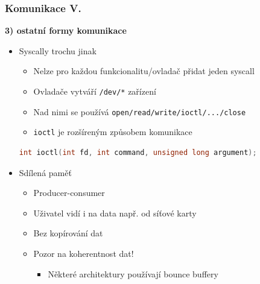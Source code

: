 \documentclass[xcolor=dvipsnames]{beamer}
\newcommand{\heading}[1]{\textbf{\textcolor{BurntOrange}{#1}}}
\begin{document}
\begin{frame}[fragile]
  \frametitle{Komunikace V.}
  \heading{3) ostatní formy komunikace}
  \begin{itemize}
  \item Syscally trochu jinak
  \begin{itemize}
  \item Nelze pro každou funkcionalitu/ovladač přidat jeden syscall
  \item Ovladače vytváří \texttt{/dev/*} zařízení
  \item Nad nimi se používá \texttt{open/read/write/ioctl/.../close}
  \item \texttt{ioctl} je rozšíreným způsobem komunikace
  \end{itemize}
  \begin{lstlisting}[language=C]
int ioctl(int fd, int command, unsigned long argument);
  \end{lstlisting}\pause
  \item Sdílená paměť
  \begin{itemize}
  \item Producer-consumer
  \item Uživatel vidí i na data např. od síťové karty
  \item Bez kopírování dat
  \item Pozor na koherentnost dat!
  \begin{itemize}
  \item Některé architektury používají bounce buffery
  \end{itemize}
  \end{itemize}
  \end{itemize}

\end{frame}
\end{document}
